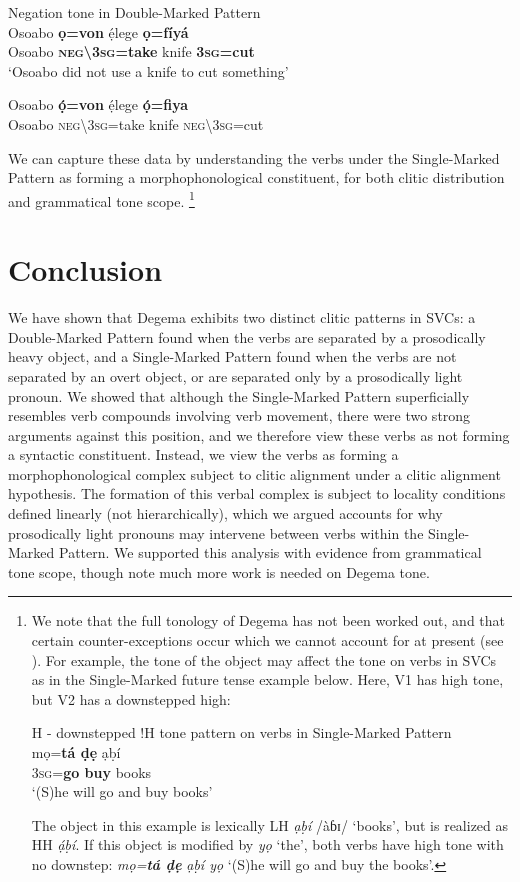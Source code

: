 \documentclass[output=paper]{langsci/langscibook}
\begin{document}
\ea
{Negation tone in Double-Marked Pattern}\\
\gll   Osoabo   \textbf{ọ=von}       ẹ́lege   \textbf{ọ=fíyá}\\
     Osoabo   \textbf{\textsc{neg{\textbackslash}3sg}=take}   knife   \textbf{3\textsc{sg}=cut}\\
\glt ‘Osoabo did not use a knife to cut something’ \citep[111]{Kari2004}
\z

\ea
\gll   *Osoabo  \textbf{ọ́=von}       ẹ́lege   \textbf{ọ́=fiya}\\
     Osoabo   \textsc{neg{\textbackslash}3sg}=take   knife   \textsc{neg{\textbackslash}}3\textsc{sg}=cut\\
\z

We can capture these data by understanding the verbs under the Single-Marked Pattern as forming a morphophonological constituent, for both clitic distribution and grammatical tone scope.%
\footnote{We 
  note that the full tonology of Degema has not been worked out, and that certain counter-exceptions occur which we cannot account for at present (see \citealt{Rolle2015}). For example, the tone of the object may affect the tone on verbs in SVCs as in the Single-Marked future tense example below. Here, V1 has high tone, but V2 has a downstepped high:

  \ea
  H - downstepped !H tone pattern on verbs in Single-Marked Pattern\\
  \gll mọ=\textbf{tá    ḍẹ}   ạḅí\\
  3\textsc{sg}=\textbf{go  buy}   books\\
  \glt ‘(S)he will go and buy books’ 
  \z 


  The object in this example is lexically LH \textit{ạḅí} /àɓɪ/ ‘books’, but is realized as HH \textit{ạ́ḅí}. If this object is modified by \textit{yọ} ‘the’, both verbs have high tone with no downstep: \textit{mọ=}\textbf{\textit{tá ḍẹ}} \textit{ạḅí yọ} ‘(S)he will go and buy the books’. 
}

\section{Conclusion}

We have shown that Degema exhibits two distinct clitic patterns in SVCs: a Double-Marked Pattern found when the verbs are separated by a prosodically heavy object, and a Single-Marked Pattern found when the verbs are not separated by an overt object, or are separated only by a prosodically light pronoun. We showed that although the Single-Marked Pattern superficially resembles verb compounds involving verb movement, there were two strong arguments against this position, and we therefore view these verbs as not forming a syntactic constituent. Instead, we view the verbs as forming a morphophonological complex subject to clitic alignment under a clitic alignment hypothesis. The formation of this verbal complex is subject to locality conditions defined linearly (not hierarchically), which we argued accounts for why prosodically light pronouns may intervene between verbs within the Single-Marked Pattern. We supported this analysis with evidence from grammatical tone scope, though note much more work is needed on Degema tone.
\end{document}

